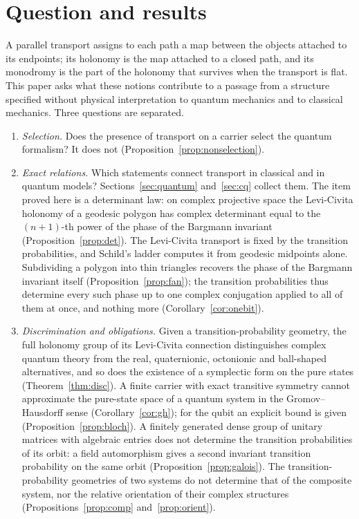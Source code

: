 \section{Question and results}

A parallel transport assigns to each path a map between the objects attached to its endpoints; its holonomy is the map attached to a closed path, and its monodromy is the part of the holonomy that survives when the transport is flat. This paper asks what these notions contribute to a passage from a structure specified without physical interpretation to quantum mechanics and to classical mechanics. Three questions are separated.

\begin{enumerate}[label=(\roman*)]
\item \emph{Selection.} Does the presence of transport on a carrier select the quantum formalism? It does not (Proposition~\ref{prop:nonselection}).
\item \emph{Exact relations.} Which statements connect transport in classical and in quantum models? Sections~\ref{sec:quantum} and~\ref{sec:cq} collect them. The item proved here is a determinant law: on complex projective space the Levi-Civita holonomy of a geodesic polygon has complex determinant equal to the $(n+1)$-th power of the phase of the Bargmann invariant (Proposition~\ref{prop:det}). The Levi-Civita transport is fixed by the transition probabilities, and Schild's ladder computes it from geodesic midpoints alone. Subdividing a polygon into thin triangles recovers the phase of the Bargmann invariant itself (Proposition~\ref{prop:fan}); the transition probabilities thus determine every such phase up to one complex conjugation applied to all of them at once, and nothing more (Corollary~\ref{cor:onebit}).
\item \emph{Discrimination and obligations.} Given a transition-probability geometry, the full holonomy group of its Levi-Civita connection distinguishes complex quantum theory from the real, quaternionic, octonionic and ball-shaped alternatives, and so does the existence of a symplectic form on the pure states (Theorem~\ref{thm:disc}). A finite carrier with exact transitive symmetry cannot approximate the pure-state space of a quantum system in the Gromov--Hausdorff sense (Corollary~\ref{cor:gh}); for the qubit an explicit bound is given (Proposition~\ref{prop:bloch}). A finitely generated dense group of unitary matrices with algebraic entries does not determine the transition probabilities of its orbit: a field automorphism gives a second invariant transition probability on the same orbit (Proposition~\ref{prop:galois}). The transition-probability geometries of two systems do not determine that of the composite system, nor the relative orientation of their complex structures (Propositions~\ref{prop:comp} and~\ref{prop:orient}).
\end{enumerate}


